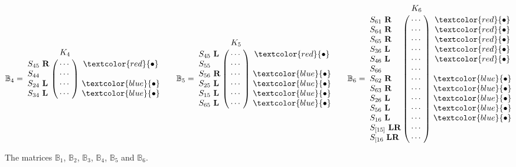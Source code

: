 \documentclass[12pt]{book}
\theoremstyle{plain}
\theoremstyle{remark}
\begin{document}
\begin{figure}
\[   \mathbb B_4 = \bordermatrix{ & K_4\cr
		S_{45}\ \textbf{R} & \cdots \cr
                S_{44}\            & \cdots \cr
                S_{24}\ \textbf{L} & \cdots \cr
                S_{34}\ \textbf{L} & \cdots }\       
                \begin{matrix}
                \textcolor{red}{\bullet} \\ \\ \textcolor{blue}{\bullet} \\ \textcolor{blue}{\bullet} 
                \end{matrix} \qquad
   \mathbb B_5 = \bordermatrix{ & K_5\cr
                S_{45}\ \textbf{L} & \cdots \cr
                S_{55}\            & \cdots \cr
                S_{56}\ \textbf{R} & \cdots \cr
                S_{25}\ \textbf{L} & \cdots \cr
                S_{15}\ \textbf{L} & \cdots \cr
                S_{65}\ \textbf{L} & \cdots }\
                \begin{matrix}
                \textcolor{red}{\bullet} \\ \\ \textcolor{blue}{\bullet} \\ \textcolor{blue}{\bullet} \\ \textcolor{blue}{\bullet} \\ \textcolor{blue}{\bullet}
                \end{matrix} \qquad
    \mathbb B_6 = \bordermatrix{ & K_6\cr
		S_{61}\ \textbf{R} & \cdots \cr
				S_{64}\ \textbf{R} & \cdots \cr
				S_{65}\ \textbf{R} & \cdots \cr
               S_{36}\ \textbf{L} & \cdots \cr
                S_{46}\ \textbf{L} & \cdots \cr
                S_{66}\            & \cdots \cr
                S_{62}\ \textbf{R} & \cdots \cr
                S_{63}\ \textbf{R} & \cdots \cr
                S_{26}\ \textbf{L} & \cdots \cr
                S_{56}\ \textbf{L} & \cdots \cr
                S_{16}\ \textbf{L} & \cdots \cr
                S_{[15]}\ \textbf{LR} & \cdots \cr
                S_{[16}\ \textbf{LR} & \cdots }\
                \begin{matrix}
                \textcolor{red}{\bullet} \\ \textcolor{red}{\bullet} \\ \textcolor{red}{\bullet} \\ \textcolor{red}{\bullet} \\ \textcolor{red}{\bullet} \\ \\ \textcolor{blue}{\bullet} \\ \textcolor{blue}{\bullet} \\ \textcolor{blue}{\bullet} \\ \textcolor{blue}{\bullet} \\ \textcolor{blue}{\bullet} \\ \\ \\
                \end{matrix} \]

\caption{The matrices $\mathbb{B}_1$, $\mathbb{B}_2$, $\mathbb{B}_3$, $\mathbb{B}_4$, $\mathbb{B}_5$ and $\mathbb{B}_6$.} \label{fig:matricesB}
\end{figure}
                
\end{document}
